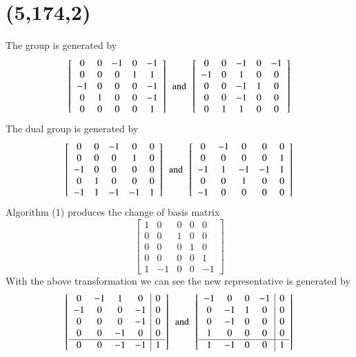   \section{(5,174,2)}
The group is generated by 
$$
  \left[ \begin {array}{ccccc} 0&0&-1&0&-1\\0&0&0&1&
1\\-1&0&0&0&-1\\0&1&0&0&-1
\\0&0&0&0&1\end {array} \right] 
\,\,\, \text{and} \,\,\,
 \left[ \begin {array}{ccccc} 0&0&-1&0&-1\\-1&0&1&0
&0\\0&0&-1&1&0\\0&0&-1&0&0
\\0&1&1&0&0\end {array} \right] 
$$
The dual group is generated by 
$$
 \left[ \begin {array}{ccccc} 0&0&-1&0&0\\0&0&0&1&0
\\-1&0&0&0&0\\0&1&0&0&0
\\-1&1&-1&-1&1\end {array} \right] 
\,\,\, \text{and} \,\,\,
 \left[ \begin {array}{ccccc} 0&-1&0&0&0\\0&0&0&0&1
\\-1&1&-1&-1&1\\0&0&1&0&0
\\-1&0&0&0&0\end {array} \right] 
$$
Algorithm (1) produces the change of basis matrix 
$$
 \left[ \begin {array}{ccccc} 1&0&0&0&0\\ 0&0&1&0&0
\\ 0&0&0&1&0\\ 0&0&0&0&1
\\ 1&-1&0&0&-1\end {array} \right] 
$$
With the above transformation we can see the new representative is generated by 
$$
\left[ \begin {array}{cccc|c} 0&-1&1&0&0\\-1&0&0&-1
&0\\0&0&0&-1&0\\0&0&-1&0&0
\\ \hline 0&0&-1&-1&1\end {array} \right] 
\,\,\, \text{and} \,\,\,
 \left[ \begin {array}{cccc|c} -1&0&0&-1&0\\0&-1&1&0
&0\\0&-1&0&0&0\\1&0&0&0&0
\\ \hline 1&-1&0&0&1\end {array} \right] 
$$
